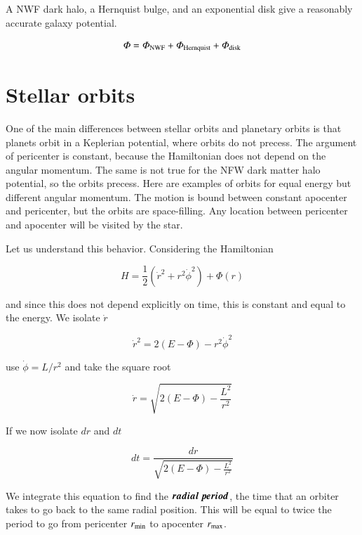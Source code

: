 A NWF dark halo, a Hernquist bulge, and an exponential disk give a reasonably accurate galaxy potential. 


\begin{equation}
\varPhi = \varPhi_{\rm NWF} + \varPhi_{\rm Hernquist} + \varPhi_{\rm disk}
\end{equation}

\section{Stellar orbits}

One of the main differences between stellar orbits and planetary orbits is that planets orbit in a Keplerian potential, where orbits do not precess. The argument of pericenter is constant, because the Hamiltonian does not depend on the angular momentum. The same is not true for the NFW dark matter halo potential, so the orbits precess. Here are examples of orbits for equal energy but different angular momentum. The motion is bound between constant apocenter and pericenter, but the orbits are space-filling. Any location between pericenter and apocenter will be visited by the star.    

Let us understand this behavior. Considering the Hamiltonian

\begin{equation}
H = \frac{1}{2}\left(\dot{r}^2 + r^2\dot\phi^2\right) + \varPhi(r) 
\end{equation}

and since this does not depend explicitly on time, this is constant and equal to the energy. We isolate $\dot{r}$  

\begin{equation}
\dot{r}^2 = 2(E-\varPhi) - r^2\dot\phi^2
\end{equation}


use $\dot\phi = L/r^2$ and take the square root 

\begin{equation}
\dot{r} = \sqrt{2(E-\varPhi) - \frac{L^2}{r^2}}
\end{equation}

If we now isolate $dr$ and $dt$ 

\begin{equation}
dt = \frac{dr}{\sqrt{2(E-\varPhi) - \frac{L^2}{r^2}}}
\end{equation}

We integrate this equation to find the ${\boldsymbol{radial \ period}}$, the time that an orbiter takes to go back to the same radial position. This will be equal to twice the period to go from pericenter $r_{\rm min}$ to apocenter $r_{\rm max}$.

